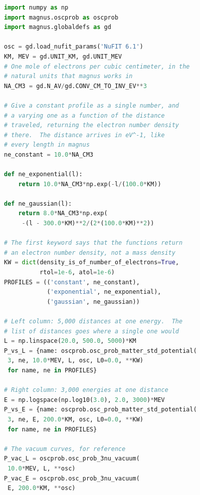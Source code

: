 \documentclass[final,5p,times,twocolumn,sort,compress]{elsarticle}
\makeatletter
\newcommand{\fig}{Fig.}
\DeclareRobustCommand{\_}{%
  \ifmmode\nfss@text{\textunderscore}\else\textunderscore\allowbreak\fi}
\newcommand{\figu}[1]{\fig~\ref{fig:#1}}
\makeatother
\begin{document}
\begin{lstlisting}[language=Python, caption={\textbf{Probability against distance and against energy.} The curves of \figu{prob_vs}: the probability at 5\,000 distances for one energy, then at 3\,000 energies for one distance, for three matter profiles and for vacuum. Each scan is a single call. The constant profile is a number; the two varying ones are functions of the distance traveled. See Sec.~\ref{sec:prob_vs} for details.}, label={lst:prob_vs}, float=tbp]
import numpy as np
import magnus.oscprob as oscprob
import magnus.globaldefs as gd

osc = gd.load_nufit_params('NuFIT 6.1')
KM, MEV = gd.UNIT_KM, gd.UNIT_MEV
# One mole of electrons per cubic centimeter, in the
# natural units that magnus works in
NA_CM3 = gd.N_AV/gd.CONV_CM_TO_INV_EV**3

# Give a constant profile as a single number, and
# a varying one as a function of the distance
# traveled, returning the electron number density
# there.  The distance arrives in eV^-1, like
# every length in magnus
ne_constant = 10.0*NA_CM3

def ne_exponential(l):
    return 10.0*NA_CM3*np.exp(-l/(100.0*KM))

def ne_gaussian(l):
    return 8.0*NA_CM3*np.exp(
     -(l - 300.0*KM)**2/(2*(100.0*KM)**2))

# The first keyword says that the functions return
# an electron number density, not a mass density
KW = dict(density_is_of_number_of_electrons=True,
          rtol=1e-6, atol=1e-6)
PROFILES = (('constant', ne_constant),
            ('exponential', ne_exponential),
            ('gaussian', ne_gaussian))

# Left column: 5,000 distances at one energy.  The
# list of distances goes where a single one would
L = np.linspace(20.0, 500.0, 5000)*KM
P_vs_L = {name: oscprob.osc_prob_matter_std_potential(
 3, ne, 10.0*MEV, L, osc, L0=0.0, **KW)
 for name, ne in PROFILES}

# Right column: 3,000 energies at one distance
E = np.logspace(np.log10(3.0), 2.0, 3000)*MEV
P_vs_E = {name: oscprob.osc_prob_matter_std_potential(
 3, ne, E, 200.0*KM, osc, L0=0.0, **KW)
 for name, ne in PROFILES}

# The vacuum curves, for reference
P_vac_L = oscprob.osc_prob_3nu_vacuum(
 10.0*MEV, L, **osc)
P_vac_E = oscprob.osc_prob_3nu_vacuum(
 E, 200.0*KM, **osc)
\end{lstlisting}
\end{document}
